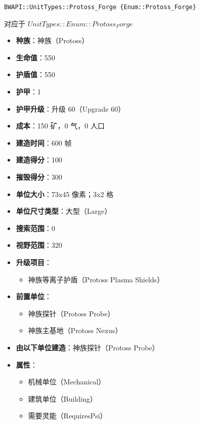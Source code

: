 \begin{tcolorbox}[colback=white, colframe=black!60!white, title=Protoss\_Forge(), arc=0mm]
    \begin{verbatim}
BWAPI::UnitTypes::Protoss_Forge {Enum::Protoss_Forge}
    \end{verbatim}
    对应于  $ UnitTypes::Enum::Protoss_Forge $ 
    \begin{itemize}
        \item \textbf{种族}：神族（Protoss）
        \item \textbf{生命值}：550
        \item \textbf{护盾值}：550
        \item \textbf{护甲}：1
        \item \textbf{护甲升级}：升级 60（Upgrade 60）
        \item \textbf{成本}：150 矿，0 气，0 人口
        \item \textbf{建造时间}：600 帧
        \item \textbf{建造得分}：100
        \item \textbf{摧毁得分}：300
        \item \textbf{单位大小}：73x45 像素；3x2 格
        \item \textbf{单位尺寸类型}：大型（Large）
        \item \textbf{搜索范围}：0
        \item \textbf{视野范围}：320
        \item \textbf{升级项目}：
            \begin{itemize}
                \item 神族等离子护盾（Protoss Plasma Shields）
            \end{itemize}
        \item \textbf{前置单位}：
            \begin{itemize}
                \item 神族探针（Protoss Probe）
                \item 神族主基地（Protoss Nexus）
            \end{itemize}
        \item \textbf{由以下单位建造}：神族探针（Protoss Probe）
        \item \textbf{属性}：
            \begin{itemize}
                \item 机械单位（Mechanical）
                \item 建筑单位（Building）
                \item 需要灵能（RequiresPsi）
            \end{itemize}
    \end{itemize}
\end{tcolorbox}

